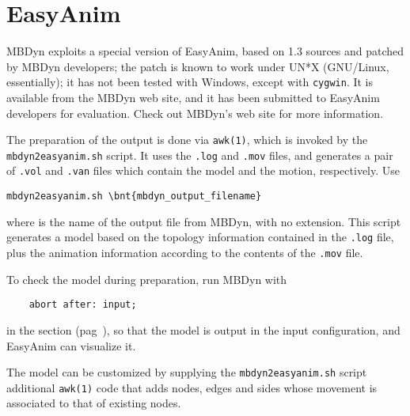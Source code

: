 \section{EasyAnim}
\label{sec:APP:OUTPUTRESULTS:EASYANIM}
MBDyn exploits a special version of EasyAnim, based on 1.3 sources
and patched by MBDyn developers; the patch is known to work under UN*X
(GNU/Linux, essentially); it has not been tested with Windows, except with
\texttt{cygwin}.
It is available from the MBDyn web site, and it has been submitted
to EasyAnim developers for evaluation.
Check out MBDyn's web site for more information.

The preparation of the output is done via \texttt{awk(1)}, which is invoked
by the \texttt{mbdyn2easyanim.sh} script.
It uses the \texttt{.log} and \texttt{.mov} files, and generates a pair of
\texttt{.vol} and \texttt{.van} files which contain the model and the motion,
respectively.
Use
\begin{Verbatim}[commandchars=\\\{\}]
    mbdyn2easyanim.sh \bnt{mbdyn_output_filename}
\end{Verbatim}
where  is the name of the output file from MBDyn,
with no extension.
This script generates a model based on the topology information
contained in the \texttt{.log} file, plus the animation information
according to the contents of the \texttt{.mov} file.

To check the model during preparation, run MBDyn with
\begin{verbatim}
    abort after: input;
\end{verbatim}
in the  section (pag~\pageref{sec:IVP:abort after}),
so that the model is output in the input configuration,
and EasyAnim can visualize it.

The model can be customized by supplying the \texttt{mbdyn2easyanim.sh}
script additional \texttt{awk(1)} code that adds nodes, edges and sides 
whose movement is associated to that of existing nodes.

